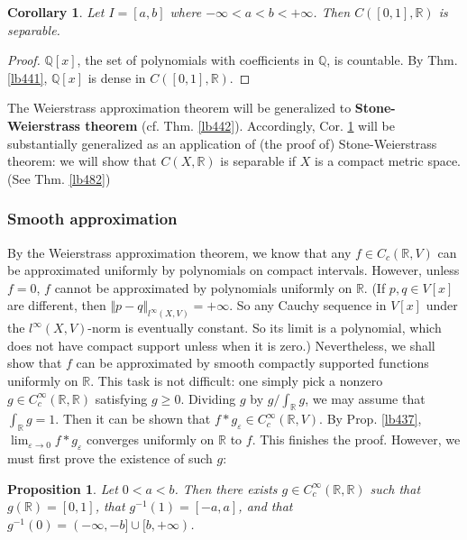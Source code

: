\documentclass[12pt,b5paper,notitlepage]{article}
\theoremstyle{definition}
\theoremstyle{plain}
\newtheorem{pp}[df]{Proposition}
\newtheorem{co}[df]{Corollary}
\newcommand{\Qbb}{\mathbb Q}
\newcommand{\Rbb}{\mathbb R}
\newcommand{\eps}{\varepsilon}
\numberwithin{equation}{section}
\begin{document}
\begin{co}\label{lb486}
Let $I=[a,b]$ where $-\infty<a<b<+\infty$. Then $C([0,1],\Rbb)$ is separable.
\end{co}

\begin{proof}
$\Qbb[x]$, the set of polynomials with coefficients in $\Qbb$, is countable. By Thm. \ref{lb441}, $\Qbb[x]$ is dense in $C([0,1],\Rbb)$.
\end{proof}

The Weierstrass approximation theorem will be generalized to \textbf{Stone-Weierstrass theorem} (cf. Thm. \ref{lb442}). Accordingly, Cor. \ref{lb486}  will be substantially generalized as an application of (the proof of) Stone-Weierstrass theorem: we will show that $C(X,\Rbb)$ is separable if $X$ is a compact metric space. (See Thm. \ref{lb482}) 



\subsubsection{Smooth approximation}

By the Weierstrass approximation theorem, we know that any $f\in C_c(\Rbb,V)$ can be approximated uniformly by polynomials on compact intervals. However, unless $f=0$, $f$ cannot be approximated by polynomials uniformly on $\Rbb$. (If $p,q\in V[x]$ are different, then $\Vert p-q\Vert_{l^\infty(X,V)}=+\infty$. So any Cauchy sequence in $V[x]$ under the ${l^\infty(X,V)}$-norm is eventually constant. So its limit is a polynomial, which does not have compact support unless when it is zero.) Nevertheless, we shall show that $f$ can be approximated by smooth compactly supported functions uniformly on $\Rbb$. This task is not difficult: one simply pick a nonzero $g\in C_c^\infty(\Rbb,\Rbb)$ satisfying $g\geq0$. Dividing $g$ by $g/\int_\Rbb g$, we may assume that $\int_\Rbb g=1$. Then it can be shown that $f*g_\eps\in C_c^\infty(\Rbb,V)$. By Prop. \ref{lb437}, $\lim_{\eps\rightarrow0}f*g_\eps$ converges uniformly on $\Rbb$ to $f$. This finishes the proof. However, we must first prove the existence of such $g$:



\begin{pp}\label{lb440}
Let $0<a<b$. Then there exists $g\in C_c^\infty(\Rbb,\Rbb)$ such that $g(\Rbb)=[0,1]$, that $g^{-1}(1)=[-a,a]$, and that $g^{-1}(0)=(-\infty,-b]\cup[b,+\infty)$.
\end{pp}
\end{document}
